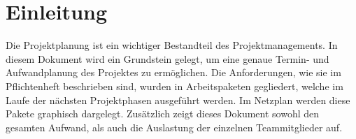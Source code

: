 \section{Einleitung}
Die Projektplanung ist ein wichtiger Bestandteil des Projektmanagements. 
In diesem Dokument wird ein Grundstein gelegt, um eine genaue Termin- und Aufwandplanung des Projektes
zu ermöglichen. 
Die Anforderungen, wie sie im Pflichtenheft beschrieben sind, wurden in Arbeitspaketen gegliedert, welche
im Laufe der nächsten Projektphasen ausgeführt werden. Im Netzplan werden diese Pakete graphisch dargelegt.
Zusätzlich zeigt dieses Dokument sowohl den gesamten Aufwand, als auch die Auslastung der einzelnen Teammitglieder auf.

